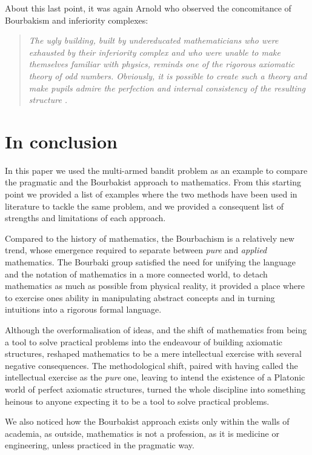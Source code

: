 \documentclass[]{scrartcl}
\theoremstyle{definition}
\begin{document}
About this last point, it was again Arnold who observed the concomitance of Bourbakism and inferiority complexes:

\begin{quotation}
    \emph{The ugly building, built by undereducated mathematicians who were exhausted by their inferiority complex and who were unable to make themselves familiar with physics, reminds one of the rigorous axiomatic theory of odd numbers. Obviously, it is possible to create such a theory and make pupils admire the perfection and internal consistency of the resulting structure 
    .}~\cite{arnol1998teaching}
\end{quotation}




\section{In conclusion}

In this paper we used the multi-armed bandit problem as an example to compare the pragmatic and the Bourbakist approach to mathematics. From this starting point we provided a list of examples where the two methods have been used in literature to tackle the same problem, and we provided a consequent list of strengths and limitations of each approach. 

Compared to the history of mathematics, the Bourbachism is a relatively new trend, whose emergence required to separate between \emph{pure} and \emph{applied} mathematics. The Bourbaki group satisfied the need for unifying the language and the notation of mathematics in a more connected world, to detach mathematics as much as possible from physical reality, it provided a place where to exercise ones ability in manipulating abstract concepts and in turning intuitions into a rigorous formal language.

Although the overformalisation of ideas, and the shift of mathematics from being a tool to solve practical problems into the endeavour of building axiomatic structures, reshaped mathematics to be a mere intellectual exercise with several negative consequences. The methodological shift, paired with having called the intellectual exercise as the \emph{pure} one, leaving to intend the existence of a Platonic world of perfect axiomatic structures, turned the whole discipline into something heinous to anyone expecting it to be a tool to solve practical problems. 

We also noticed how the Bourbakist approach exists only within the walls of academia, as outside, mathematics is not a profession, as it is medicine or engineering, unless practiced in the pragmatic way.
\end{document}
